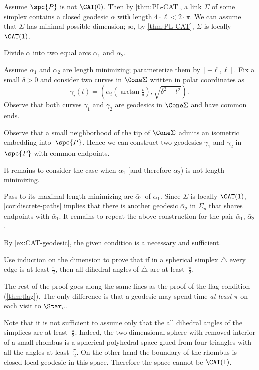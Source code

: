 Assume $\spc{P}$ is not $\CAT(0)$.
Then by \ref{thm:PL-CAT}, a link $\Sigma$ of some simplex contains a closed geodesic $\alpha$ with length $4\cdot\ell<2\cdot\pi$.
We can assume that $\Sigma$ has minimal possible dimension;
so, by \ref{thm:PL-CAT}, $\Sigma$ is locally $\CAT(1)$.

Divide $\alpha$ into two equal arcs $\alpha_1$ and $\alpha_2$.

Assume $\alpha_1$ and $\alpha_2$ are length minimizing;
parameterize them by $[-\ell,\ell]$.
Fix a small $\delta>0$ and 
consider two curves in $\Cone\Sigma$ written in polar coordinates as 
\[\gamma_i(t)=(\alpha_i(\arctan \tfrac t\delta),\sqrt{\delta^2+t^2}).\]
Observe that both curves $\gamma_1$ and $\gamma_2$ are geodesics in $\Cone\Sigma$ and  have common ends.

Observe that a small neighborhood of the tip of $\Cone\Sigma$ admits an isometric embedding into~$\spc{P}$.
Hence we can construct two geodesics $\gamma_1$ and $\gamma_2$ in $\spc{P}$ with common endpoints.

It remains to consider the case when $\alpha_1$ (and therefore $\alpha_2$) is not length minimizing.

Pass to its maximal length minimizing arc $\bar\alpha_1$ of $\alpha_1$.
Since $\Sigma$ is locally $\CAT(1)$, \ref{cor:discrete-paths} implies that 
there is another geodesic $\bar\alpha_2$ in $\Sigma_p$ that shares endpoints with $\bar\alpha_1$.
It remains to repeat the above construction for the pair $\bar\alpha_1$, $\bar\alpha_2$.


By \ref{ex:CAT-geodesic}, the given condition is a necessary and sufficient.

Use induction on the dimension  to prove that if in a spherical simplex $\triangle$ every edge is at least $\tfrac\pi2$, then 
all dihedral angles of $\triangle$ are at least~$\tfrac\pi2$.

The rest of the proof goes along the same lines as the proof of the flag condition (\ref{thm:flag}).
The only difference is that a geodesic may spend time \emph{at least} $\pi$ on each visit to $\Star_v$.

Note that it is not sufficient to assume only that the all dihedral angles of the simplices are at least~$\tfrac\pi2$. 
Indeed, the two-dimensional sphere with removed interior of a small rhombus is a spherical polyhedral space glued from four triangles with all the angles at least~$\tfrac\pi2$.
On the other hand the boundary of the rhombus is closed local geodesic in this space.
Therefore the space cannot be $\CAT(1)$.

